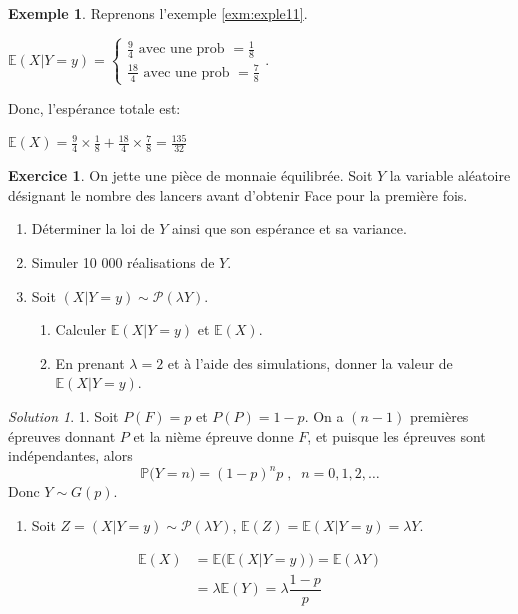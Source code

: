 \documentclass[
]{book}
\providecommand{\tightlist}{%
  \setlength{\itemsep}{0pt}\setlength{\parskip}{0pt}}
\theoremstyle{definition}
\theoremstyle{definition}
\newtheorem{example}{Exemple}[chapter]
\theoremstyle{definition}
\newtheorem{exercise}{Exercice}[chapter]
\theoremstyle{remark}
\newtheorem*{solution}{Solution }
\begin{document}
\begin{example}
\protect\hypertarget{exm:unnamed-chunk-25}{}{\label{exm:unnamed-chunk-25} }Reprenons l'exemple \ref{exm:exple11}.

\(\mathbb{E}\left( X|Y=y\right)= \begin{cases}  \frac{9}{4} \text{  avec une prob } =\frac{1}{8}\\  \frac{18}{4} \text{ avec une prob  }=\frac{7}{8}  \end{cases}\).

Donc, l'espérance totale est:

\(\mathbb{E}\left(X\right)= \frac{9}{4} \times \frac{1}{8} + \frac{18}{4} \times \frac{7}{8} = \frac{135}{32}\)
\end{example}

\begin{exercise}
\protect\hypertarget{exr:unnamed-chunk-26}{}{\label{exr:unnamed-chunk-26} }On jette une pièce de monnaie équilibrée. Soit \(Y\) la variable aléatoire désignant le nombre des lancers avant d'obtenir Face pour la première fois.

\begin{enumerate}
\def\labelenumi{\arabic{enumi}.}
\tightlist
\item
  Déterminer la loi de \(Y\) ainsi que son espérance et sa variance.
\item
  Simuler 10 000 réalisations de \(Y\).
\item
  Soit \(\left(X|Y=y\right)\sim \mathcal{P}(\lambda Y)\).

  \begin{enumerate}
  \def\labelenumii{\alph{enumii})}
  \tightlist
  \item
    Calculer \(\mathbb{E}\left(X|Y=y\right)\) et \(\mathbb{E}\left(X\right)\).
  \item
    En prenant \(\lambda=2\) et à l'aide des simulations, donner la valeur de
    \(\mathbb{E}\left(X|Y=y\right)\).
  \end{enumerate}
\end{enumerate}
\end{exercise}

\begin{solution}
{}1. Soit \(P(F)=p\) et \(P(P)=1-p\). On a \((n-1)\) premières épreuves donnant \(P\) et la nième épreuve donne \(F\), et puisque les épreuves sont indépendantes, alors
\[
\mathbb{P}\bigl(Y=n \bigr)={(1-p)}^{n}p\;,\;\; n=0,1,2,\ldots  
  \]
Donc \(Y\sim G(p)\).

\begin{enumerate}
\def\labelenumi{\arabic{enumi}.}
\setcounter{enumi}{1}
\tightlist
\item
  Soit \(Z=(X|Y=y)\sim \mathcal{P}(\lambda Y)\), \(\mathbb{E}\left(Z\right)=\mathbb{E}\left(X|Y=y\right)= \lambda Y\).
\end{enumerate}

\begin{align*}
\mathbb{E}\left(X\right)&=\mathbb{E}\bigl(\mathbb{E}\left(X|Y=y\right)\bigr)=\mathbb{E}(\lambda Y)\\
&= \lambda \mathbb{E}(Y)=\lambda \dfrac{1-p}{p}
\end{align*}
\end{solution}
\end{document}
